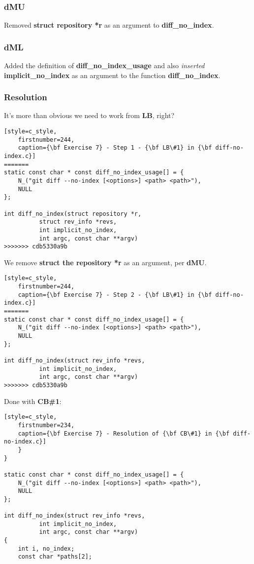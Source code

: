 \subsubsection*{dMU}
Removed {\bf struct repository *r} as an argument to {\bf diff\_no\_index}.

\subsubsection*{dML}
Added the definition of {\bf diff\_no\_index\_usage} and also {\it inserted} {\bf implicit\_no\_index} as an argument to
the function {\bf diff\_no\_index}.

\subsubsection*{Resolution}
It's more than obvious we need to work from {\bf LB}, right?

\begin{lstlisting}[style=c_style,
	firstnumber=244,
	caption={\bf Exercise 7} - Step 1 - {\bf LB\#1} in {\bf diff-no-index.c}]
=======
static const char * const diff_no_index_usage[] = {
	N_("git diff --no-index [<options>] <path> <path>"),
	NULL
};

int diff_no_index(struct repository *r,
		  struct rev_info *revs,
		  int implicit_no_index,
		  int argc, const char **argv)
>>>>>>> cdb5330a9b
\end{lstlisting}

We remove {\bf struct the repository *r} as an argument, per {\bf dMU}.

\begin{lstlisting}[style=c_style,
	firstnumber=244,
	caption={\bf Exercise 7} - Step 2 - {\bf LB\#1} in {\bf diff-no-index.c}]
=======
static const char * const diff_no_index_usage[] = {
	N_("git diff --no-index [<options>] <path> <path>"),
	NULL
};

int diff_no_index(struct rev_info *revs,
		  int implicit_no_index,
		  int argc, const char **argv)
>>>>>>> cdb5330a9b
\end{lstlisting}

Done with {\bf CB\#1}:

\begin{lstlisting}[style=c_style,
	firstnumber=234,
	caption={\bf Exercise 7} - Resolution of {\bf CB\#1} in {\bf diff-no-index.c}]
	}
}

static const char * const diff_no_index_usage[] = {
	N_("git diff --no-index [<options>] <path> <path>"),
	NULL
};

int diff_no_index(struct rev_info *revs,
		  int implicit_no_index,
		  int argc, const char **argv)
{
	int i, no_index;
	const char *paths[2];
\end{lstlisting}

